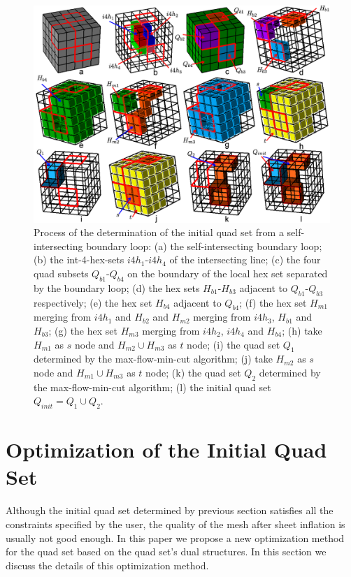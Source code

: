 \documentclass[final,5p,times,twocolumn]{elsarticle}
\begin{document}
\begin{figure}[htbp]
\begin{center}
\includegraphics[width=13cm]{figures/int_init_qs.png}
\caption{Process of the determination of the initial quad set from a self-intersecting boundary loop: (a) the self-intersecting boundary loop; (b) the int-4-hex-sets $i4h_1$-$i4h_4$ of the intersecting line; (c) the four quad subsets $Q_{b1}$-$Q_{b4}$ on the boundary of the local hex set separated by the boundary loop; (d) the hex sets $H_{b1}$-$H_{b3}$ adjacent to $Q_{b1}$-$Q_{b3}$ respectively; (e) the hex set $H_{b4}$ adjacent to $Q_{b4}$; (f) the hex set $H_{m1}$ merging from $i4h_1$ and $H_{b2}$ and $H_{m2}$ merging from $i4h_3$, $H_{b1}$ and $H_{b3}$; (g) the hex set $H_{m3}$ merging from $i4h_2$, $i4h_4$ and $H_{b4}$; (h) take $H_{m1}$ as $s$ node and $H_{m2}\cup H_{m3}$ as $t$ node; (i) the quad set $Q_1$ determined by the max-flow-min-cut algorithm; (j) take $H_{m2}$ as $s$ node and $H_{m1} \cup H_{m3}$ as $t$ node; (k) the quad set $Q_2$ determined by the max-flow-min-cut algorithm; (l) the initial quad set $Q_{init}=Q_1 \cup Q_2$.}
\label{fig:int_init_qs}
\end{center}
\end{figure}

\section{Optimization of the Initial Quad Set}
\label{sec:opt_init_qs}
Although the initial quad set determined by previous section satisfies all the constraints specified by the user, the quality of the mesh after sheet inflation is usually not good enough. In this paper we propose a new optimization method for the quad set based on the quad set's dual structures. In this section we discuss the details of this optimization method.
\end{document}

